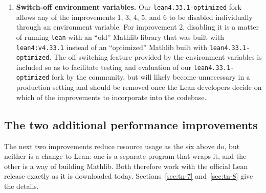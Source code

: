 \documentclass{article}
\newcommand{\Lean}{Lean\xspace}      %
\newcommand{\lean}{\texttt{lean}\xspace}      %
\newcommand{\mathlib}{Mathlib\xspace}
\newcommand{\currentlean}{\texttt{lean4:v4.33.1}\xspace}
\newcommand{\altlean}{\texttt{lean4.33.1-\allowbreak optimized}\xspace}
\begin{document}
\begin{enumerate}
\item \textbf{Switch-off environment variables.}
Our \altlean fork allows any of the improvements 1, 3, 4, 5, and 6 to be disabled individually through an environment variable. For improvement 2, disabling it is a matter of running \lean with an ``old'' \mathlib library that was built with \currentlean instead of an ``optimized'' \mathlib built with \altlean. The off-switching feature provided by the environment variables is included so as to facilitate testing and evaluation of our \altlean fork by the community, but will likely become unnecessary in a production setting and should be removed once the \Lean developers decide on which of the improvements to incorporate into the codebase.

\end{enumerate}

\subsection{The two additional performance improvements}

\label{sec:snapshot-and-compiledtac}

The next two improvements reduce resource usage as the six above do, but neither is a change to \Lean: one is a separate program that wraps it, and the other is a way of building \mathlib. Both therefore work with the official \Lean release exactly as it is downloaded today. Sections~\ref{sec:tn-7} and~\ref{sec:tn-8} give the details.
\end{document}
